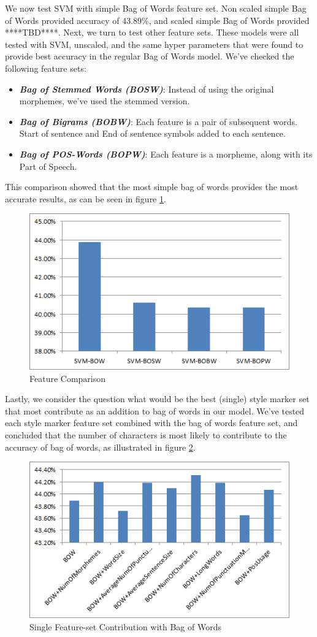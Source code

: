 \documentclass[a4paper]{article}
\begin{document}
We now test SVM with simple Bag of Words feature set.
Non scaled simple Bag of Words provided accuracy of 43.89\%, and scaled simple Bag of Words provided ****TBD****.
Next, we turn to test other feature sets. These models were all tested with SVM, unscaled, and the same hyper parameters that were found to provide best accuracy in the regular Bag of Words model. We've checked the following feature sets:
\begin{itemize}
\item \textbf{\emph{Bag of Stemmed Words (BOSW)}}: Instead of using the original morphemes, we've used the stemmed version.
\item \textbf{\emph{Bag of Bigrams (BOBW)}}: Each feature is a pair of subsequent words. Start of sentence and End of sentence symbols added to each sentence.
\item \textbf{\emph{Bag of POS-Words (BOPW)}}: Each feature is a morpheme, along with its Part of Speech.
\end{itemize}
This comparison showed that the most simple bag of words provides the most accurate results, as can be seen in figure \ref{fig:feature comparison}.
\begin{figure}[!h]
	\centering
	\includegraphics[width=.5\textwidth]{"figures/feature_comparison"}
	\caption{Feature Comparison}
	\label{fig:feature comparison}
\end{figure}
Lastly, we consider the question what would be the best (single) style marker set that most contribute as an addition to bag of words in our model.
We've tested each style marker feature set combined with the bag of words feature set, and concluded that the number of characters is most likely to contribute to the accuracy of bag of words, as illustrated in figure \ref{fig:contribute}.
\begin{figure}[!h]
	\centering
	\includegraphics[width=.5\textwidth]{"figures/contribute"}
	\caption{Single Feature-set Contribution with Bag of Words}
	\label{fig:contribute}
\end{figure}
\end{document}
